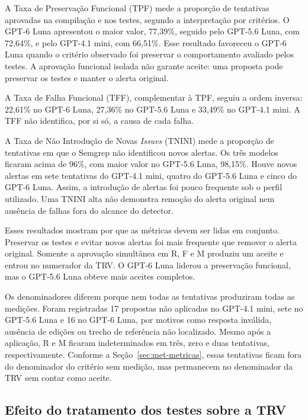 A Taxa de Preservação Funcional (TPF) mede a proporção de tentativas aprovadas na compilação e nos testes, segundo a interpretação por critérios. O GPT-6 Luna apresentou o maior valor, 77,39\%, seguido pelo GPT-5.6 Luna, com 72,64\%, e pelo GPT-4.1 mini, com 66,51\%. Esse resultado favoreceu o GPT-6 Luna quando o critério observado foi preservar o comportamento avaliado pelos testes. A aprovação funcional isolada não garante aceite: uma proposta pode preservar os testes e manter o alerta original.

A Taxa de Falha Funcional (TFF), complementar à TPF, seguiu a ordem inversa: 22,61\% no GPT-6 Luna, 27,36\% no GPT-5.6 Luna e 33,49\% no GPT-4.1 mini. A TFF não identifica, por si só, a causa de cada falha.

A Taxa de Não Introdução de Novas \textit{Issues} (TNINI) mede a proporção de tentativas em que o Semgrep não identificou novos alertas. Os três modelos ficaram acima de 96\%, com maior valor no GPT-5.6 Luna, 98,15\%. Houve novos alertas em sete tentativas do GPT-4.1 mini, quatro do GPT-5.6 Luna e cinco do GPT-6 Luna. Assim, a introdução de alertas foi pouco frequente sob o perfil utilizado. Uma TNINI alta não demonstra remoção do alerta original nem ausência de falhas fora do alcance do detector.

Esses resultados mostram por que as métricas devem ser lidas em conjunto. Preservar os testes e evitar novos alertas foi mais frequente que remover o alerta original. Somente a aprovação simultânea em R, F e M produziu um aceite e entrou no numerador da TRV. O GPT-6 Luna liderou a preservação funcional, mas o GPT-5.6 Luna obteve mais aceites completos.

Os denominadores diferem porque nem todas as tentativas produziram todas as medições. Foram registradas 17 propostas não aplicadas no GPT-4.1 mini, sete no GPT-5.6 Luna e 16 no GPT-6 Luna, por motivos como resposta inválida, ausência de edições ou trecho de referência não localizado. Mesmo após a aplicação, R e M ficaram indeterminados em três, zero e duas tentativas, respectivamente. Conforme a Seção~\ref{sec:met-metricas}, essas tentativas ficam fora do denominador do critério sem medição, mas permanecem no denominador da TRV sem contar como aceite.

\subsection{Efeito do tratamento dos testes sobre a TRV}
\label{sec:res-tratamento-testes}

